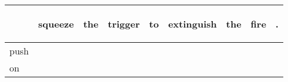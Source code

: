 \documentclass[landscape]{article}
\newcommand{\ssp}{\hspace{2pt}}
\begin{document}
\newpage

\noindent\begin{tabular}{|l|p{10pt}|p{10pt}|p{10pt}|p{10pt}|p{10pt}|p{10pt}|p{10pt}|p{10pt}|}
\hline
&\begin{sideways}\cellcolor{ref0}squeeze\hspace{12pt}\end{sideways}&\begin{sideways}\cellcolor{ref1}the\hspace{12pt}\end{sideways}&\begin{sideways}\cellcolor{ref2}trigger\hspace{12pt}\end{sideways}&\begin{sideways}\cellcolor{ref3}to\hspace{12pt}\end{sideways}&\begin{sideways}\cellcolor{ref4}extinguish\hspace{12pt}\end{sideways}&\begin{sideways}\cellcolor{ref5}the\hspace{12pt}\end{sideways}&\begin{sideways}\cellcolor{ref6}fire\hspace{12pt}\end{sideways}&\begin{sideways}\cellcolor{ref7}.\hspace{12pt}\end{sideways}\\
\hline
\ssp push \ssp&\hspace{2pt}&\hspace{2pt}&\hspace{2pt}&\hspace{2pt}&\hspace{2pt}&\hspace{2pt}&\hspace{2pt}&\hspace{2pt}\\
\hline
\ssp on \ssp&\hspace{2pt}&\hspace{2pt}&\hspace{2pt}&\hspace{2pt}&\hspace{2pt}&\hspace{2pt}&\hspace{2pt}&\hspace{2pt}\\

\end{tabular}
\end{document}
